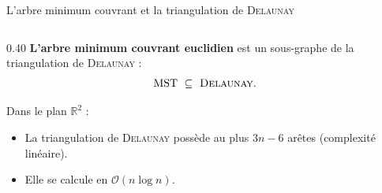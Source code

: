 \documentclass[A4,svgnames,9pt,aspectratio=169]{beamer}
\begin{document}
\begin{frame}{L'arbre minimum couvrant et la triangulation de \textnormal{\textsc{Delaunay}}}
\begin{columns}[c, onlytextwidth]
        \begin{column}{0.40\textwidth}
            \textbf{L'arbre minimum couvrant euclidien} est un sous-graphe de la triangulation de \textnormal{\textsc{Delaunay}} \cite{BoissonnatChazalYvinec} :
            \[
                \mathrm{MST} \ \subseteq \ \text{\textsc{Delaunay}}.
            \]
            
            \vspace{0.8cm}
            
            Dans le plan $\mathbb{R}^2$ :
            \begin{itemize}
                \setlength{\itemsep}{8pt}
                \item La triangulation de \textnormal{\textsc{Delaunay}} possède au plus $3n-6$ arêtes (complexité linéaire).
                \item Elle se calcule en $\mathcal{O}(n \log n)$.
            \end{itemize}
        \end{column}
    \end{columns}
\end{frame}
\end{document}
